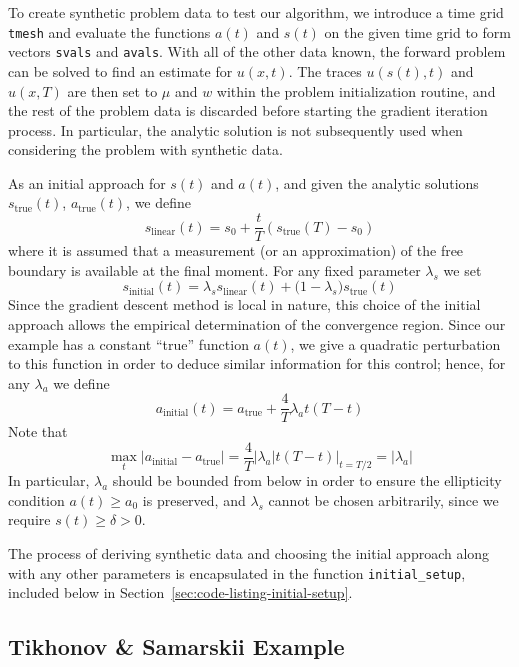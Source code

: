 \documentclass[letterpaper, 10pt, draft]{amsart}
\theoremstyle{definition}
\theoremstyle{remark}
\begin{document}
To create synthetic problem data to test our algorithm, we introduce a time grid
\verb+tmesh+ and evaluate the functions $a(t)$ and $s(t)$ on the given time grid
to form vectors \verb+svals+ and \verb+avals+.
With all of the other data known, the forward problem can be solved to find
an estimate for $u(x,t)$.
The traces $u(s(t),t)$ and $u(x,T)$ are then set to $\mu$ and $w$ within the
problem initialization routine, and the rest of the problem data is discarded
before starting the gradient iteration process.
In particular, the analytic solution is not subsequently used when considering
the problem with synthetic data.

As an initial approach for $s(t)$ and $a(t)$, and given the analytic solutions
$s_{\text{true}}(t)$, $a_{\text{true}}(t)$, we define
\begin{equation}
  s_{\text{linear}}(t) = s_0 + \frac{t}{T}\left(s_{\text{true}}(T) - s_0\right)
\end{equation}
where it is assumed that a measurement (or an approximation) of the
free boundary is available at the final moment.
For any fixed parameter $\lambda_s$ we set
\begin{equation}
  s_{\text{initial}}(t) = \lambda_s s_{\text{linear}}(t) + \big(1-\lambda_s\big)s_{\text{true}}(t)
\end{equation}
Since the gradient descent method is local in nature, this choice of the initial
approach allows the empirical determination of the convergence region.
Since our example has a constant ``true'' function $a(t)$, we give a quadratic
perturbation to this function in order to deduce similar information for this
control; hence, for any $\lambda_a$ we define
\begin{equation}
  a_{\text{initial}}(t) = a_{\text{true}}
  + \frac{4}{T}\lambda_a t (T-t)
\end{equation}
Note that
\[
  \max_t \vert a_{\text{initial}} - a_{\text{true}} \vert
  = \frac{4}{T} \vert \lambda_a \vert t (T-t) \vert_{t=T/2}
  = \vert \lambda_a \vert
\]
In particular, $\lambda_a$ should be bounded from below in order to ensure the
ellipticity condition $a(t) \geq a_0$ is preserved, and $\lambda_s$ cannot be
chosen arbitrarily, since we require $s(t) \geq \delta > 0$.

The process of deriving synthetic data and choosing the initial approach along
with any other parameters is encapsulated in the function \verb+initial_setup+,
included below in Section~\ref{sec:code-listing-initial-setup}.

\subsection{Tikhonov \& Samarskii Example}
\end{document}
